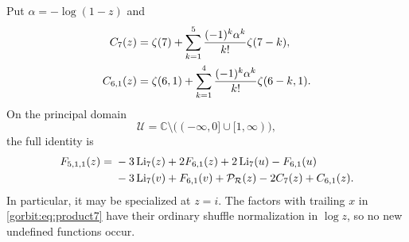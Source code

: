 Put $\alpha=-\log(1-z)$ and
\begin{align}
 C_7(z)&=\zeta(7)+\sum_{k=1}^{5}
                   \frac{(-1)^k\alpha^k}{k!}\zeta(7-k),\notag\\
 C_{6,1}(z)&=\zeta(6,1)+\sum_{k=1}^{4}
                   \frac{(-1)^k\alpha^k}{k!}\zeta(6-k,1).
 \label{gorbit:eq:endpoint7}
\end{align}
On the principal domain
\[
 \mathcal U=\mathbb C\setminus
                  \bigl(( -\infty,0]\cup[1,\infty)\bigr),
\]
the full identity is
\begin{align}
 F_{5,1,1}(z)={}&-3\operatorname{Li}_7(z)+2F_{6,1}(z)
       +2\operatorname{Li}_7(u)-F_{6,1}(u)\notag\\
 &-3\operatorname{Li}_7(v)+F_{6,1}(v)
       +\mathcal P_{\mathcal R}(z)-2C_7(z)+C_{6,1}(z).
 \label{gorbit:eq:weight7-full}
\end{align}
In particular, it may be specialized at $z=i$. The factors with trailing
$x$ in \eqref{gorbit:eq:product7} have their ordinary shuffle
normalization in $\log z$, so no new undefined functions occur.

